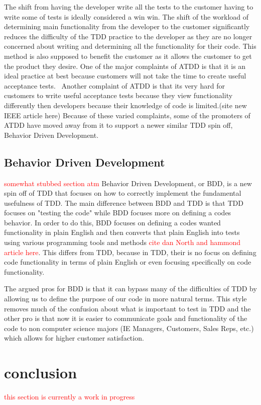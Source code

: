 \documentclass{sig-alternate}
\newcommand{\mycomment}[1]{\textcolor{red}{#1}}
\begin{document}
The shift from having the developer write all the tests to the customer having to write some of tests is ideally considered a win win.  The shift of the workload of determining main functionality from the developer to the customer significantly reduces the difficulty of the TDD practice to the developer as they are no longer concerned about writing and determining all the functionality for their code.  This method is also supposed to benefit the customer as it allows the customer to get the product they desire.  One of the major complaints of ATDD is that it is an ideal practice at best because customers will not take the time to create useful acceptance tests.~\cite{Hammond:2012} Another complaint of ATDD is that its very hard for  customers to write useful acceptance tests  because they view functionality differently then developers because their knowledge of code is limited.(site new IEEE article here)  Because of these varied complaints, some of the promoters of ATDD have moved away from it to support a newer similar TDD spin off, Behavior Driven Development.

\subsection{Behavior Driven Development}
\mycomment{somewhat stubbed section atm}
Behavior Driven Development, or BDD, is a new spin off of TDD that focuses on how to correctly implement the fundamental usefulness of TDD.  The main difference between BDD and TDD is that TDD focuses on "testing the code" while BDD focuses more on defining a codes behavior. 
In order to do this, BDD focuses on defining a codes wanted functionality in plain English and then converts that plain English into tests using various programming tools and methods \mycomment{cite dan North and hammond article here}. This differs from TDD, because in TDD, their is no focus on defining code functionality in terms of plain English or even focusing specifically on code functionality.

The argued pros for BDD is that it can bypass many of the difficulties of TDD by allowing us to define the purpose of our code in more natural terms. This style removes much of the confusion about what is important to test in TDD and the other pro is that now it is easier to communicate goals and functionality of the code to non computer science majors (IE Managers, Customers, Sales Reps, etc.) which allows for higher customer satisfaction.

\section{conclusion}
\mycomment{this section is currently a work in progress}
\end{document}
